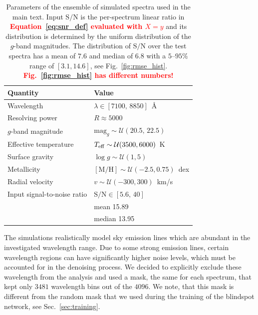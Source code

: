 \documentclass[twocolumn]{aastex7}
\newcommand{\ld}[1]{\textcolor{red}{\textbf{#1}}}
\newcommand{\SNR}{\mathrm{S}/\mathrm{N}}
\begin{document}
\begin{table}[h]
    \begin{tabular}{ll}
        \hline
        Quantity & Value \\
        \hline
        Wavelength & $\lambda \in [7100,\,8850]$~\AA \\
        Resolving power & $R \approx 5000$ \\
        $g$-band magnitude & $\mathrm{mag}_g \sim \mathcal{U}(20.5,\,22.5)$ \\
        Effective temperature & $T_{\rm eff} \sim \mathcal{U}(3500,6000)$~K \\
        Surface gravity & $\log g \sim \mathcal{U}(1,5)$ \\
        Metallicity & $[\mathrm{M}/\mathrm{H}] \sim \mathcal{U}(-2.5,0.75)$~dex \\
        Radial velocity & $v \sim \mathcal{U}(-300,300)$~km/s \\
        Input signal-to-noise ratio
        & $\SNR \in [5.6,\,40]$ \\
        & mean 15.89 \\
        & median 13.95 \\
        \hline
    \end{tabular}
    \caption{
        Parameters of the ensemble of simulated spectra used in the main text. Input $\SNR$ is the per-spectrum linear ratio in \ld{Equation~\ref{eq:snr_def} evaluated with $X{=}y$} and its distribution is determined by the uniform distribution of the $g$-band magnitudes. The distribution of $\SNR$ over the test spectra has a mean of $7.6$ and median of $6.8$ with a $5$--$95\%$ range of $[3.1,14.6]$, see Fig.~\ref{fig:rmse_hist}.
        \ld{Fig.~\ref{fig:rmse_hist} has different numbers!}
    }
    \label{tab:data_summary}
\end{table}

The simulations realistically model sky emission lines which are abundant in the investigated wavelength range. Due to some strong emission lines, certain wavelength regions can have significantly higher noise levels, which must be accounted for in the denoising process. We decided to explicitly exclude these wavelength from the analysis and used a mask, the same for each spectrum, that kept only $3481$ wavelength bins out of the $4096$. We note, that this mask is different from the random mask that we used during the training of the blindspot network, see Sec.~\ref{sec:training}.
\end{document}
